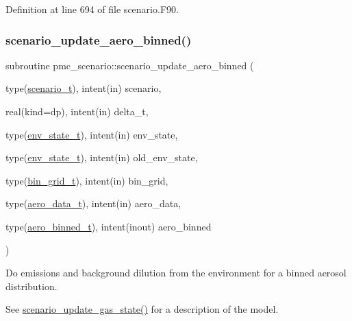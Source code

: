 Definition at line 694 of file scenario.\+F90.

\mbox{\label{namespacepmc__scenario_aa8ca6c77c94665bdbf4c4f25e2dd1523}} 
\subsubsection{\texorpdfstring{scenario\+\_\+update\+\_\+aero\+\_\+binned()}{scenario\_update\_aero\_binned()}}
{\footnotesize\ttfamily subroutine pmc\+\_\+scenario\+::scenario\+\_\+update\+\_\+aero\+\_\+binned (\begin{DoxyParamCaption}\item[{type(\mbox{\hyperlink{structpmc__scenario_1_1scenario__t}{scenario\+\_\+t}}), intent(in)}]{scenario,  }\item[{real(kind=dp), intent(in)}]{delta\+\_\+t,  }\item[{type(\mbox{\hyperlink{structpmc__env__state_1_1env__state__t}{env\+\_\+state\+\_\+t}}), intent(in)}]{env\+\_\+state,  }\item[{type(\mbox{\hyperlink{structpmc__env__state_1_1env__state__t}{env\+\_\+state\+\_\+t}}), intent(in)}]{old\+\_\+env\+\_\+state,  }\item[{type(\mbox{\hyperlink{structpmc__bin__grid_1_1bin__grid__t}{bin\+\_\+grid\+\_\+t}}), intent(in)}]{bin\+\_\+grid,  }\item[{type(\mbox{\hyperlink{structpmc__aero__data_1_1aero__data__t}{aero\+\_\+data\+\_\+t}}), intent(in)}]{aero\+\_\+data,  }\item[{type(\mbox{\hyperlink{structpmc__aero__binned_1_1aero__binned__t}{aero\+\_\+binned\+\_\+t}}), intent(inout)}]{aero\+\_\+binned }\end{DoxyParamCaption})}



Do emissions and background dilution from the environment for a binned aerosol distribution. 

See \mbox{\hyperlink{namespacepmc__scenario_a8da20291ae6441134e5f1788a906e96b}{scenario\+\_\+update\+\_\+gas\+\_\+state()}} for a description of the model.


